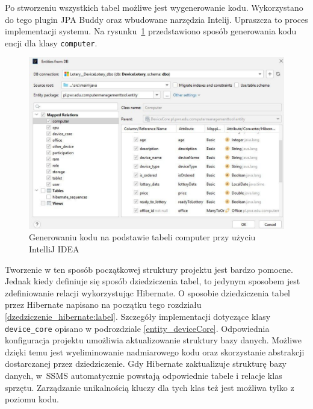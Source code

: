 Po stworzeniu wszystkich tabel możliwe jest wygenerowanie kodu. Wykorzystano do tego plugin JPA Buddy oraz wbudowane narzędzia Intelij. Upraszcza to proces implementacji systemu. Na rysunku~\ref{generate:label} przedstawiono sposób generowania kodu encji dla klasy \texttt{computer}.
\makeatletter
\setlength{\@fptop}{0pt}
\makeatother
\begin{figure}[t!]
		\centering
    \includegraphics[width=0.7\linewidth]{rys04/generate.pdf}
    \caption{Generowaniu kodu na podstawie tabeli computer przy użyciu IntelliJ IDEA}
    \label{generate:label}
\end{figure}

Tworzenie w ten sposób początkowej struktury projektu jest bardzo pomocne. Jednak kiedy definiuje się sposób dziedziczenia tabel, to jedynym sposobem jest zdefiniowanie relacji wykorzystując Hibernate. O sposobie dziedziczenia tabel przez Hibernate napisano na początku tego rozdziału \ref{dzedziczenie_hibernate:label}. Szczegóły implementacji dotyczące klasy \texttt{device\_core} opisano w podrozdziale \ref{entity_deviceCore}. Odpowiednia konfiguracja projektu umożliwia aktualizowanie struktury bazy danych. Możliwe dzięki temu jest wyeliminowanie nadmiarowego kodu oraz skorzystanie abstrakcji dostarczanej przez dziedziczenie. Gdy Hibernate zaktualizuje strukturę bazy danych, w~SSMS automatycznie powstają odpowiednie tabele i relacje klas sprzętu. Zarządzanie unikalnością kluczy dla tych klas też jest możliwa tylko z poziomu kodu.
 
